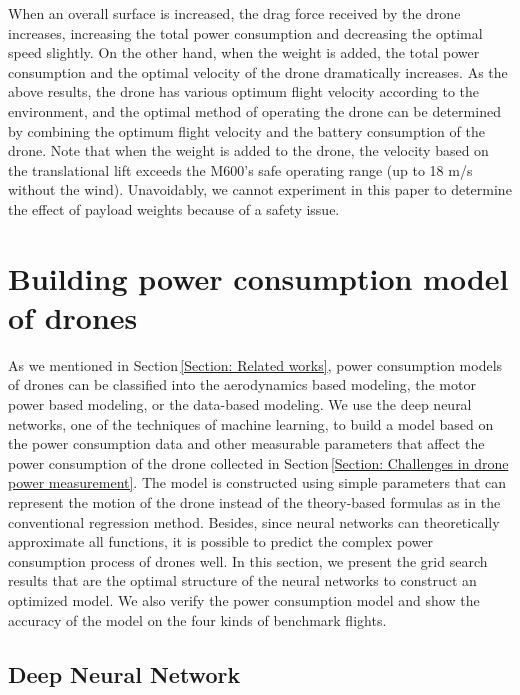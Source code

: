 \documentclass[journal]{./template/IEEEtran}
\begin{document}
When an overall surface is increased, the drag force received by the drone increases, increasing the total power consumption and decreasing the optimal speed slightly. 
On the other hand, when the weight is added, the total power consumption and the optimal velocity of the drone dramatically increases.
As the above results, the drone has various optimum flight velocity according to the environment, and the optimal method of operating the drone can be determined by combining the optimum flight velocity and the battery consumption of the drone.
Note that when the weight is added to the drone, the velocity based on the translational lift exceeds the M600's safe operating range (up to 18 m/s without the wind). Unavoidably, we cannot experiment in this paper to determine the effect of payload weights because of a safety issue. 









\section{Building power consumption model of drones}
\label{Section: Power consumption model for drones}
As we mentioned in Section\,\ref{Section: Related works}, power consumption models of drones can be classified into the aerodynamics based modeling, the motor power based modeling, or the data-based modeling. 
We use the deep neural networks, one of the techniques of machine learning, to build a model based on the power consumption data and other measurable parameters that affect the power consumption of the drone collected in Section\,\ref{Section: Challenges in drone power measurement}.
The model is constructed using simple parameters that can represent the motion of the drone instead of the theory-based formulas as in the conventional regression method. 
Besides, since neural networks can theoretically approximate all functions, it is possible to predict the complex power consumption process of drones well.
In this section, we present the grid search results that are the optimal structure of the neural networks to construct an optimized model. 
We also verify the power consumption model and show the accuracy of the model on the four kinds of benchmark flights.





\subsection{Deep Neural Network}
\end{document}

